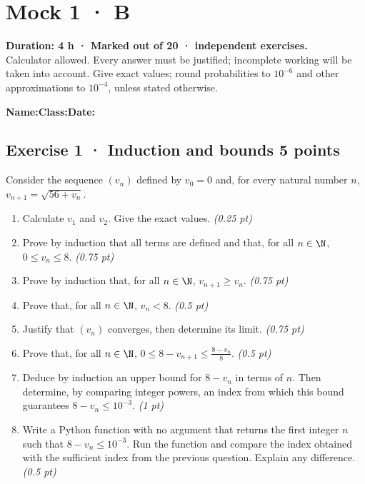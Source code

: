 \fi

\fi

\ifmxteacher

\mxnewpage{}\label{sujet:5-4}

\section*{Mock 1 · B}


\textbf{Duration: 4 h · Marked out of 20 ·  independent exercises.}\\Calculator allowed. Every answer must be justified; incomplete working will be taken into account. Give exact values; round probabilities to $10^{-6}$ and other approximations to $10^{-4}$, unless stated otherwise.

\smallskip\textbf{Name:}\enspace\dotfill\quad\textbf{Class:}\enspace\dotfill\quad\textbf{Date:}\enspace\dotfill

\subsection*{Exercise 1 · Induction and bounds \hfill 5 points}Consider the sequence $(v_n)$ defined by $v_0=0$ and, for every natural number $n$, $v_{n+1}=\sqrt{56+v_n}$.

\begin{enumerate}

\item Calculate $v_1$ and $v_2$. Give the exact values. \hfill\textit{(0.25 pt)}

\item Prove by induction that all terms are defined and that, for all $n\in\N$, $0\le v_n\le8$. \hfill\textit{(0.75 pt)}

\item Prove by induction that, for all $n\in\N$, $v_{n+1}\ge v_n$. \hfill\textit{(0.75 pt)}

\item Prove that, for all $n\in\N$, $v_n<8$. \hfill\textit{(0.5 pt)}

\item Justify that $(v_n)$ converges, then determine its limit. \hfill\textit{(0.75 pt)}

\item Prove that, for all $n\in\N$, $0\le 8-v_{n+1}\le\frac{8-v_n}{8}$. \hfill\textit{(0.5 pt)}

\item Deduce by induction an upper bound for $8-v_n$ in terms of $n$. Then determine, by comparing integer powers, an index from which this bound guarantees $8-v_n\le10^{-3}$. \hfill\textit{(1 pt)}

\item Write a Python function with no argument that returns the first integer $n$ such that $8-v_n\le10^{-3}$. Run the function and compare the index obtained with the sufficient index from the previous question. Explain any difference. \hfill\textit{(0.5 pt)}

\end{enumerate}

